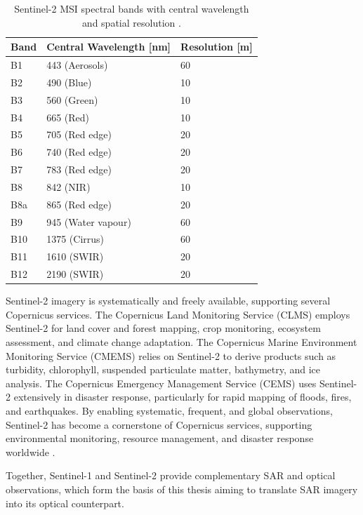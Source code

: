\begin{table}[h]
\centering
\caption{Sentinel-2 MSI spectral bands with central wavelength and spatial resolution \cite{sentiwiki}.}
\label{tab:sentinel2_bands}
\begin{tabular}{@{}lll@{}}
\toprule
\textbf{Band} & \textbf{Central Wavelength [nm]} & \textbf{Resolution [m]} \\ \midrule
B1  & 443  (Aerosols)                & 60 \\
B2  & 490  (Blue)                    & 10 \\
B3  & 560  (Green)                   & 10 \\
B4  & 665  (Red)                     & 10 \\
B5  & 705  (Red edge)                & 20 \\
B6  & 740  (Red edge)                & 20 \\
B7  & 783  (Red edge)                & 20 \\
B8  & 842  (NIR)                     & 10 \\
B8a & 865  (Red edge)                & 20 \\
B9  & 945  (Water vapour)            & 60 \\
B10 & 1375 (Cirrus)                  & 60 \\
B11 & 1610 (SWIR)                    & 20 \\
B12 & 2190 (SWIR)                    & 20 \\ \bottomrule
\end{tabular}
\end{table}

Sentinel-2 imagery is systematically and freely available, supporting several Copernicus services. The Copernicus Land Monitoring Service (CLMS) employs Sentinel-2 for land cover and forest mapping, crop monitoring, ecosystem assessment, and climate change adaptation. The Copernicus Marine Environment Monitoring Service (CMEMS) relies on Sentinel-2 to derive products such as turbidity, chlorophyll, suspended particulate matter, bathymetry, and ice analysis. The Copernicus Emergency Management Service (CEMS) uses Sentinel-2 extensively in disaster response, particularly for rapid mapping of floods, fires, and earthquakes. By enabling systematic, frequent, and global observations, Sentinel-2 has become a cornerstone of Copernicus services, supporting environmental monitoring, resource management, and disaster response worldwide \cite{sentiwiki}.  

Together, Sentinel-1 and Sentinel-2 provide complementary SAR and optical observations, which form the basis of this thesis aiming to translate SAR imagery into its optical counterpart.

